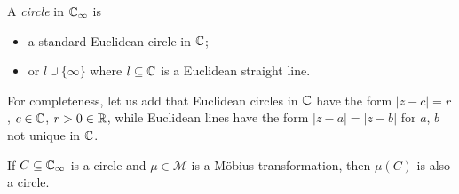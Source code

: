 \documentclass{../template/note}
\begin{document}
    \begin{definition}
        A \emph{circle} in \(\mathbb C_\infty\) is
        \begin{itemize}
            \item a standard Euclidean circle in \(\mathbb C\);
            \item or \(l \cup \{\infty\}\) where \(l \subseteq \mathbb C\) is a Euclidean straight line.
        \end{itemize}
    \end{definition}
    
    \begin{remark}
        For completeness, let us add that Euclidean circles in \(\mathbb C\) have the form \(|z-c| = r\), \(c \in \mathbb C\), \(r > 0 \in \mathbb R\), while Euclidean lines have the form \(|z-a| = |z-b|\) for \(a\), \(b\) not unique in \(\mathbb C\).
    \end{remark}
    
    \begin{theorem}
        If \(C \subseteq \mathbb C_\infty\) is a circle and \(\mu \in \mathcal M\) is a M\"obius transformation, then \(\mu(C)\) is also a circle.
    \end{theorem}
    
\end{document}
